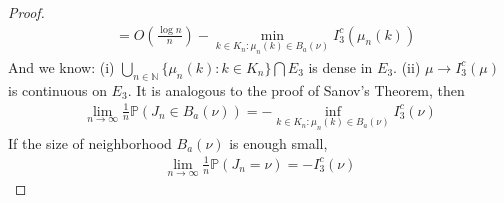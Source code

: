 \documentclass[11pt,en,cite=authoryear]{elegantpaper}
\begin{document}
\begin{proof}
\begin{align*}
        &= O(\frac{\log n}{n}) - \min_{k \in K_n: \mu_n(k) \in B_a(\nu)} I_3^c(\mu_n(k))
    \end{align*}
    And we know:
    (i) $\bigcup_{n\in \mathbb{N}} \{\mu_n(k): k \in K_n\} \bigcap E_3$ is dense in $E_3$.
    (ii) $\mu \rightarrow I_3^c(\mu)$ is continuous on $E_3$.
    It is analogous to the proof of Sanov's Theorem, then
    \begin{align*}
        \lim_{n \rightarrow \infty} \frac{1}{n} \mathbb{P}(J_n \in B_a(\nu)) 
        = -\inf_{k \in K_n: \mu_n(k) \in B_a(\nu)} I_3^c(\nu)
    \end{align*}
    If the size of neighborhood $B_a(\nu)$ is enough small, 
    \begin{align*}
        \lim_{n \rightarrow \infty} \frac{1}{n} \mathbb{P}(J_n = \nu) 
        = - I_3^c(\nu)
    \end{align*}
\end{proof}
\end{document}
